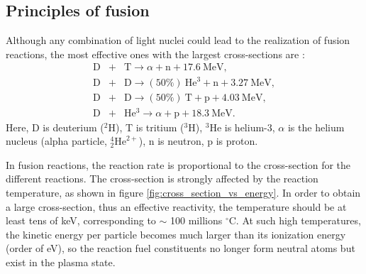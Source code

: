 \subsection{Principles of fusion} \label{sec:principles_fusion}


Although any combination of light nuclei could lead to the realization of fusion reactions, the most effective ones with the largest cross-sections are \cite{Freidberg_2007_Plasma}:%
\begin{eqnarray}
    \mathrm{D} &+& \mathrm{T} \rightarrow \alpha + \mathrm{n} + \mathrm{17.6\ MeV}, \\
    \mathrm{D} &+& \mathrm{D} \rightarrow (50\%)\ \mathrm{He^3} + \mathrm{n} + \mathrm{3.27\ MeV}, \\
    \mathrm{D} &+& \mathrm{D} \rightarrow (50\%)\ \mathrm{T} + \mathrm{p} + \mathrm{4.03\ MeV}, \\
    \mathrm{D} &+& \mathrm{He^3} \rightarrow \alpha + \mathrm{p} + \mathrm{18.3\ MeV}.
\end{eqnarray}
\noindent Here, D is deuterium ($^2\mathrm{H}$), T is tritium ($^3\mathrm{H}$), $^3\mathrm{He}$ is helium-3, $\alpha$ is the helium nucleus (alpha particle, $_2^4\mathrm{He}^{2+}$), n is neutron, p is proton.

In fusion reactions, the reaction rate is proportional to the cross-section for the different reactions. The cross-section is strongly affected by the reaction temperature, as shown in figure \ref{fig:cross_section_vs_energy}. In order to obtain a large cross-section, thus an effective reactivity, the temperature should be at least tens of keV, corresponding to $\sim$ 100 millions $^\circ$C. At such high temperatures, the kinetic energy per particle becomes much larger than its ionization energy (order of eV), so the reaction fuel constituents no longer form neutral atoms but exist in the plasma state.


